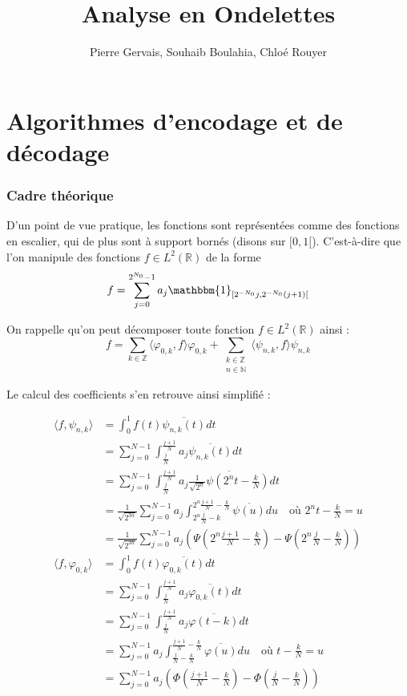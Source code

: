 \documentclass[]{article}
\author{Pierre Gervais, Souhaib Boulahia, Chloé Rouyer}
\title{Analyse en Ondelettes}
\theoremstyle{remark}
\theoremstyle{definition}
\begin{document}
\newpage

\part{Algorithmes d'encodage et de décodage}

\section{Cadre théorique}

D'un point de vue pratique, les fonctions sont représentées comme des fonctions en escalier, qui de plus sont à support bornés (disons sur $[0, 1[$). C'est-à-dire que l'on manipule des fonctions $f \in L^2(\mathbb{R})$ de la forme $$f = \sum_{j = 0}^{2^{N_0} - 1} a_j \mathbbm{1}_{[2^{-N_0}j, 2^{-N_0}(j+1)[}$$


On rappelle qu'on peut décomposer toute fonction $f \in L^2(\mathbb{R})$ ainsi : $$f = \sum_{k \in \mathbb{Z}} \langle \varphi_{0,k}, f \rangle \varphi_{0,k} + \sum_{\substack{k \in \mathbb{Z} \\ n \in \mathbb{N}}} \langle \psi_{n, k}, f \rangle \psi_{n, k}$$

Le calcul des coefficients s'en retrouve ainsi simplifié :

\begin{align*}
	\langle f, \psi_{n, k} \rangle &= \int_0^1 f(t) \overline{\psi_{n, k}(t)} dt \\
	&= \sum_{j=0}^{N-1} \int_{\frac j N}^{\frac{j+1}N} a_j \overline{\psi_{n, k}(t)} dt \\
	&= \sum_{j=0}^{N-1} \int_{\frac j N}^{\frac{j+1}N} a_j \overline{\frac{1}{\sqrt{2^n}} \psi(2^n t - \frac{k}{N})} dt \\
	&= \frac{1}{\sqrt{2^{3n}}} \sum_{j=0}^{N-1} a_j \int_{2^n \frac{j}N - k}^{2^n\frac{j+1}N - \frac{k}{N}} \overline{\psi(u)} du \quad \text{où $2^nt - \frac{k}{N} = u$} \\
	&= \frac{1}{\sqrt{2^{3n}}} \sum_{j=0}^{N-1} a_j \left(\Psi\left(2^n\frac{j+1}N - \frac{k}{N}\right) - \Psi\left(2^n\frac{j}N - \frac{k}{N}\right)\right) \\
	\langle f, \varphi_{0, k} \rangle &= \int_0^1 f(t) \overline{\varphi_{0, k}(t)} dt \\
	&= \sum_{j=0}^{N-1} \int_{\frac j N}^{\frac{j+1}N} a_j \overline{\varphi_{0, k}(t)} dt \\
	&= \sum_{j=0}^{N-1} \int_{\frac j N}^{\frac{j+1}N} a_j \overline{\varphi(t - k)} dt \\
	&= \sum_{j=0}^{N-1} a_j \int_{\frac{j}N - \frac{k}{N}}^{\frac{j+1}N - \frac{k}{N}} \overline{\varphi(u)} du \quad \text{où $t - \frac{k}{N} = u$} \\
	&= \sum_{j=0}^{N-1} a_j \left(\Phi\left(\frac{j+1}N - \frac{k}{N}\right) - \Phi\left(\frac{j}N - \frac{k}{N}\right)\right)
\end{align*}
\end{document}
